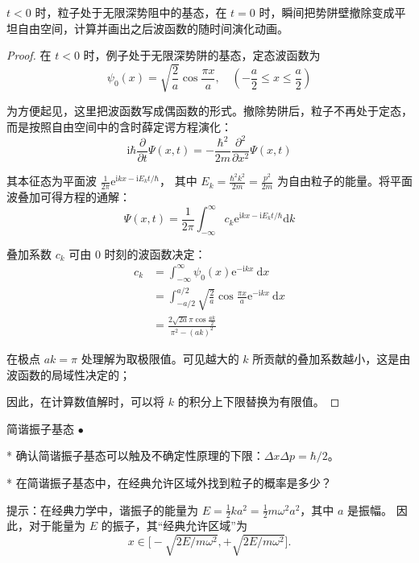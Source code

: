 \begin{3}
    $ t<0$ 时，粒子处于无限深势阻中的基态，在 $t=0$ 时，瞬间把势阱壁撤除变成平坦自由空间，计算并画出之后波函数的随时间演化动画。
\end{3}
\begin{proof}
    在 $t<0$ 时，例子处于无限深势阱的基态，定态波函数为
$$\psi_{0}(x)=\sqrt{\frac{2}{a}} \cos \frac{\pi x}{a}, 
\quad\left(-\frac{a}{2} \leq x \leq \frac{a}{2}\right)$$

为方便起见，这里把波函数写成偶函数的形式。撤除势阱后，粒子不再处于定态，而是按照自由空间中的含时薛定谔方程演化：
$$\mathrm{i} \hbar \frac{\partial}{\partial t} \Psi(x, t)
=-\frac{\hbar^{2}}{2 m} \frac{\partial^{2}}{\partial x^{2}} \Psi(x, t)$$

其本征态为平面波 $\frac{1}{2 \pi} \mathrm{e}^{\mathrm{i} k x-\mathrm{i} E_{k} t / \hbar}$，
其中 $E_{k}=\frac{\hbar^{2} k^{2}}{2m}=\frac{p^{2}}{2m}$ 为自由粒子的能量。将平面波叠加可得方程的通解：
$$\Psi(x, t)=\frac{1}{2 \pi} \int_{-\infty}^{\infty} c_{k} \mathrm{e}^{\mathrm{i} k x-\mathrm{i} E_{k} t / \hbar} \mathrm{d} k$$

叠加系数 $c_{k}$ 可由 $0$ 时刻的波函数决定：
$$
\begin{aligned}
c_{k} & =\int_{-\infty}^{\infty} \psi_{0}(x) \mathrm{e}^{-\mathrm{i} k x} \mathrm{~d} x \\
& =\int_{-a/2}^{a/2} \sqrt{\frac{2}{a}} \cos \frac{\pi x}{a} \mathrm{e}^{-\mathrm{i} k x} \mathrm{~d} x \\
& =\frac{2 \sqrt{2a} \pi \cos \frac{a k}{2}}{\pi^{2}-(a k)^{2}}
\end{aligned}
$$

在极点 $a k=\pi$ 处理解为取极限值。可见越大的 $k$ 所贡献的叠加系数越小，这是由波函数的局域性决定的；

因此，在计算数值解时，可以将 $k$ 的积分上下限替换为有限值。
\end{proof}
\begin{4}
    简谐振子基态 $\bullet$

* 确认简谐振子基态可以触及不确定性原理的下限：$\Delta x \Delta p=\hbar/2$。

* 在简谐振子基态中，在经典允许区域外找到粒子的概率是多少？

提示：在经典力学中，谐振子的能量为 $E=\frac{1}{2} k a^{2}=\frac{1}{2} m \omega^{2} a^{2}$，其中 $a$ 是振幅。
因此，对于能量为 $E$ 的振子，其``经典允许区域''为 
$$x\in \big[\!-\!\sqrt{2E/m\omega^{2}},+\sqrt{2E/m\omega^{2}}\big].$$
\end{4}

